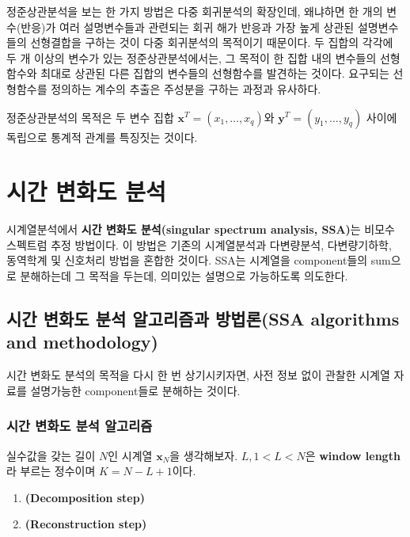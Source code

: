 \documentclass[b5paper,]{scrbook}
\theoremstyle{plain}
\theoremstyle{definition}
\numberwithin{equation}{section}
\begin{document}
정준상관분석을 보는 한 가지 방법은 다중 회귀분석의 확장인데, 왜냐하면 한 개의 변수(반응)가 여러 설명변수들과 관련되는 회귀 해가 반응과 가장 높게 상관된 설명변수들의 선형결합을 구하는 것이 다중 회귀분석의 목적이기 때문이다. 두 집합의 각각에 두 개 이상의 변수가 있는 정준상관분석에서는, 그 목적이 한 집합 내의 변수들의 선형함수와 최대로 상관된 다른 집합의 변수들의 선형함수를 발견하는 것이다. 요구되는 선형함수를 정의하는 계수의 추출은 주성분을 구하는 과정과 유사하다.

정준상관분석의 목적은 두 변수 집합 \(\mathbf{x}^{T}=(x_{1},\ldots, x_{q})\)와 \(\mathbf{y}^{T}=(y_{1},\ldots, y_{q})\) 사이에 독립으로 통계적 관계를 특징짓는 것이다.

\hypertarget{SSA}{%
\chapter{시간 변화도 분석}\label{SSA}}

시계열분석에서 \textbf{시간 변화도 분석(singular spectrum analysis, SSA)}는 비모수 스펙트럼 추정 방법이다. 이 방법은 기존의 시계열분석과 다변량분석, 다변량기하학, 동역학계 및 신호처리 방법을 혼합한 것이다. SSA는 시계열을 component들의 sum으로 분해하는데 그 목적을 두는데, 의미있는 설명으로 가능하도록 의도한다.

\hypertarget{----ssa-algorithms-and-methodology}{%
\section{시간 변화도 분석 알고리즘과 방법론(SSA algorithms and methodology)}\label{----ssa-algorithms-and-methodology}}

시간 변화도 분석의 목적을 다시 한 번 상기시키자면, 사전 정보 없이 관찰한 시계열 자료를 설명가능한 component들로 분해하는 것이다.

\hypertarget{---}{%
\subsection{시간 변화도 분석 알고리즘}\label{---}}

실수값을 갖는 길이 \(N\)인 시계열 \(\mathbf{x}_{N}\)을 생각해보자. \(L, 1<L<N\)은 \textbf{window length}라 부르는 정수이며 \(K=N-L+1\)이다.

\begin{enumerate}
\def\labelenumi{\arabic{enumi}.}
\item
  \textbf{(Decomposition step)}
\item
  \textbf{(Reconstruction step)}
\end{enumerate}
\end{document}
